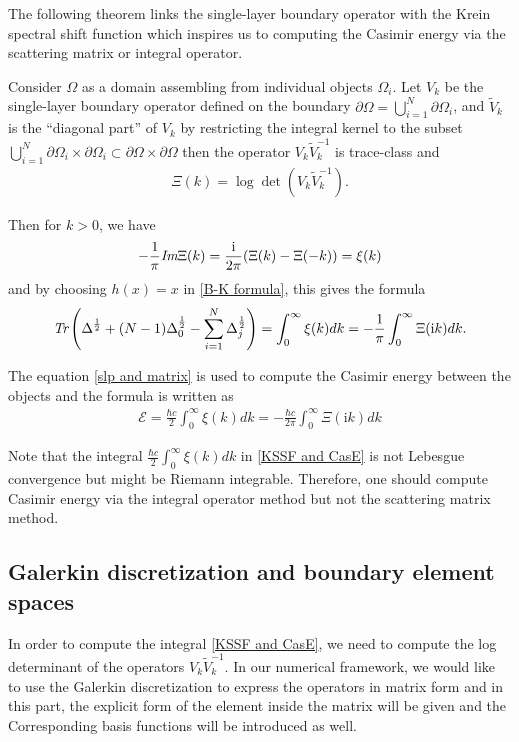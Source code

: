 The following theorem links the single-layer boundary operator with the Krein spectral shift function which inspires us to computing the Casimir energy 
via the scattering matrix or integral operator. 
\begin{theorem}\cite{hanisch2020relative}
    Consider $\Omega$ as a domain assembling from individual objects $\Omega_{i}$. Let $V_{k}$ be the single-layer boundary operator defined on the boundary 
    $\partial\Omega = \bigcup_{i = 1}^{N}\partial\Omega_{i}$, and $\tilde{V}_{k}$ is the ``diagonal part'' of $V_{k}$ by restricting the integral 
    kernel to the subset $\bigcup_{i = 1}^{N}\partial\Omega_{i}\times\partial\Omega_{i}\subset\partial\Omega\times\partial\Omega$ then the operator 
    $V_{k}\tilde{V}_{k}^{-1}$ is trace-class and 
    \begin{align*}
        \Xi(k) = \log\det\left(V_{k}\tilde{V}_{k}^{-1}\right).
    \end{align*}

    Then for $k > 0$, we have 
    \begin{align*}
        -\frac{1}{\pi}\emph{\text{Im}}\Xi(k) = \frac{\mathrm{i}}{2\pi}(\Xi(k) - \Xi(-k)) = \xi(k)
    \end{align*}
    and by choosing $h(x) = x$ in \eqref{B-K formula}, this gives the formula 
    \begin{align}\label{slp and matrix}
        \emph{\text{Tr}}\left(\Delta^{\frac{1}{2}} + (N - 1)\Delta_{0}^{\frac{1}{2}} - \sum_{i = 1}^{N}\Delta_{j}^{\frac{1}{2}}\right)  = 
        \int_{0}^{\infty}\xi(k)dk = -\frac{1}{\pi}\int_{0}^{\infty}\Xi(\mathrm{i}k)dk.
    \end{align}
\end{theorem}

The equation \eqref{slp and matrix} is used to compute the Casimir energy between the objects and the formula is written as
\begin{align}\label{KSSF and CasE}
    \mathcal{E} = \frac{\hbar c}{2}\int_{0}^{\infty}\xi(k)dk = -\frac{\hbar c}{2\pi}\int_{0}^{\infty}\Xi(\mathrm{i}k)dk
\end{align}

\begin{remark}
    Note that the integral $\frac{\hbar c}{2}\int_{0}^{\infty}\xi(k)dk$ in \eqref{KSSF and CasE} is not Lebesgue convergence but might be Riemann integrable. 
    Therefore, one should compute Casimir energy via the integral operator method but not the scattering matrix method.
\end{remark}
\subsection{Galerkin discretization and boundary element spaces}
In order to compute the integral \eqref{KSSF and CasE}, we need to compute the log determinant of the operators $V_{k}\tilde{V}_{k}^{-1}$. In our numerical 
framework, we would like to use the Galerkin discretization to express the operators in matrix form and in this part, the explicit form of the element inside
the matrix will be given and the Corresponding basis functions will be introduced as well.

